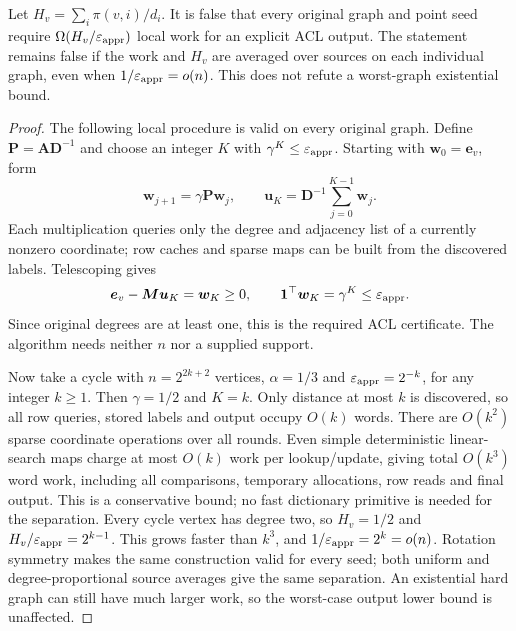\begin{proposition}
\label{prop:op3-pointwise-mass-lower-bound-refuted}
Let $H_v=\sum_i\pi(v,i)/d_i$. It is false that every original graph and
point seed require $\Omega(H_v/\varepsilon_{\mathrm{appr}})$ local work for an explicit
ACL output. The statement remains false if the work and $H_v$ are
averaged over sources on each individual graph, even when
$1/\varepsilon_{\mathrm{appr}}=o(n)$. This does not refute a worst-graph existential bound.
\end{proposition}
\begin{proof}
The following local procedure is valid on every original graph. Define
$\bm P=\bm A\bm D^{-1}$ and choose an integer $K$ with
$\gamma^K\leq\varepsilon_{\mathrm{appr}}$. Starting with $\bm w_0=\bm e_v$, form
\[
 \bm w_{j+1}=\gamma\bm P\bm w_j,\qquad
 \bm u_K=\bm D^{-1}\sum_{j=0}^{K-1}\bm w_j.
\]
Each multiplication queries only the degree and adjacency list of a
currently nonzero coordinate; row caches and sparse maps can be built
from the discovered labels. Telescoping gives
\[
 \bm e_v-\bm M\bm u_K=\bm w_K\geq0,
 \qquad \mathbf{1}^\top\bm w_K=\gamma^K\leq\varepsilon_{\mathrm{appr}}.
\]
Since original degrees are at least one, this is the required ACL
certificate. The algorithm needs neither $n$ nor a supplied support.

Now take a cycle with $n=2^{2k+2}$ vertices, $\alpha=1/3$ and
$\varepsilon_{\mathrm{appr}}=2^{-k}$, for any integer $k\geq1$. Then $\gamma=1/2$
and $K=k$. Only distance at most $k$ is discovered, so all row queries,
stored labels and output occupy $O(k)$ words. There are $O(k^2)$ sparse
coordinate operations over all rounds. Even simple deterministic
linear-search maps charge at most $O(k)$ work per lookup/update, giving
total $O(k^3)$ word work, including all comparisons, temporary
allocations, row reads and final output. This is a conservative bound;
no fast dictionary primitive is needed for the separation.
Every cycle vertex has degree two, so $H_v=1/2$ and
$H_v/\varepsilon_{\mathrm{appr}}=2^{k-1}$. This grows faster than $k^3$, and
$1/\varepsilon_{\mathrm{appr}}=2^k=o(n)$. Rotation symmetry makes the same construction
valid for every seed; both uniform and degree-proportional source
averages give the same separation. An existential hard graph can still
have much larger work, so the worst-case output lower bound is unaffected.
\end{proof}

